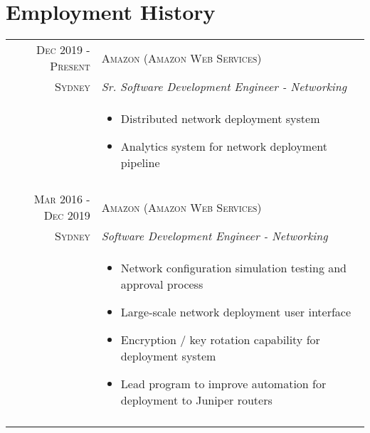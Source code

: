 \section*{Employment History}

\begin{tabular}{r|p{11cm}}

\textsc{Dec 2019 - Present} & \textsc{Amazon (Amazon Web Services)}\\
\textsc{Sydney} & \emph{Sr. Software Development Engineer - Networking}\\
& \begin{footnotesize}
\begin{itemize}
	\vspace*{-\baselineskip}
	\item Distributed network deployment system
	\item Analytics system for network deployment pipeline
	\vspace*{-\baselineskip}
\end{itemize}
\end{footnotesize}\\

\multicolumn{2}{c}{} \\

\textsc{Mar 2016 - Dec 2019} & \textsc{Amazon (Amazon Web Services)}\\
\textsc{Sydney} & \emph{Software Development Engineer - Networking}\\
& \begin{footnotesize}
\begin{itemize}
	\vspace*{-\baselineskip}
	\item Network configuration simulation testing and approval process
	\item Large-scale network deployment user interface
	\item Encryption / key rotation capability for deployment system
	\item Lead program to improve automation for deployment to Juniper routers
	\vspace*{-\baselineskip}
\end{itemize}
\end{footnotesize}\\

\multicolumn{2}{c}{} \\


\end{tabular}
